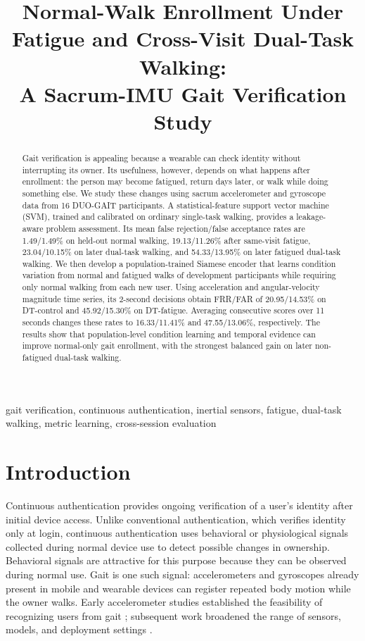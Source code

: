 \documentclass[conference]{IEEEtran}
\title{Normal-Walk Enrollment Under Fatigue and Cross-Visit Dual-Task Walking:\\A Sacrum-IMU Gait Verification Study}
\author{\IEEEauthorblockN{Bamidele Akinyemi}
\IEEEauthorblockA{Department of Artificial Intelligence\\
University of Wyoming\\
Laramie, WY 82071, USA\\
bakinyem@uwyo.edu}
\and
\IEEEauthorblockN{Diksha Shukla}
\IEEEauthorblockA{Department of Artificial Intelligence\\
University of Wyoming\\
Laramie, WY 82071, USA\\
dshukla@uwyo.edu}}
\begin{document}
\maketitle

\begin{abstract}
Gait verification is appealing because a wearable can check identity without interrupting its owner. Its usefulness, however, depends on what happens after enrollment: the person may become fatigued, return days later, or walk while doing something else. We study these changes using sacrum accelerometer and gyroscope data from 16 DUO-GAIT participants. A statistical-feature support vector machine (SVM), trained and calibrated on ordinary single-task walking, provides a leakage-aware problem assessment. Its mean false rejection/false acceptance rates are 1.49/1.49\% on held-out normal walking, 19.13/11.26\% after same-visit fatigue, 23.04/10.15\% on later dual-task walking, and 54.33/13.95\% on later fatigued dual-task walking. We then develop a population-trained Siamese encoder that learns condition variation from normal and fatigued walks of development participants while requiring only normal walking from each new user. Using acceleration and angular-velocity magnitude time series, its 2-second decisions obtain FRR/FAR of 20.95/14.53\% on DT-control and 45.92/15.30\% on DT-fatigue. Averaging consecutive scores over 11 seconds changes these rates to 16.33/11.41\% and 47.55/13.06\%, respectively. The results show that population-level condition learning and temporal evidence can improve normal-only gait enrollment, with the strongest balanced gain on later non-fatigued dual-task walking.
\end{abstract}

\begin{IEEEkeywords}
gait verification, continuous authentication, inertial sensors, fatigue, dual-task walking, metric learning, cross-session evaluation
\end{IEEEkeywords}

\section{Introduction}
Continuous authentication provides ongoing verification of a user's identity after initial device access. Unlike conventional authentication, which verifies identity only at login, continuous authentication uses behavioral or physiological signals collected during normal device use to detect possible changes in ownership. Behavioral signals are attractive for this purpose because they can be observed during normal use. Gait is one such signal: accelerometers and gyroscopes already present in mobile and wearable devices can register repeated body motion while the owner walks. Early accelerometer studies established the feasibility of recognizing users from gait \cite{Mantyjarvi2005,Derawi2010,Kwapisz2010}; subsequent work broadened the range of sensors, models, and deployment settings \cite{SpragerReview2015,Abuhamad2020}.
\end{document}
